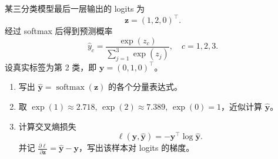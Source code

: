 某三分类模型最后一层输出的 logits 为
\[
\bm{z} = (1, 2, 0)^\top.
\]
经过 softmax 后得到预测概率
\[
\hat{y}_c = \frac{\exp(z_c)}{\sum_{j=1}^{3} \exp(z_j)},\quad c = 1, 2, 3.
\]
设真实标签为第 2 类，即 $\bm{y} = (0, 1, 0)^\top$。
\begin{enumerate}
    \item 写出 $\hat{\bm{y}} = \operatorname{softmax}(\bm{z})$ 的各个分量表达式。
    \item 取 $\exp(1) \approx 2.718$, $\exp(2) \approx 7.389$, $\exp(0) = 1$，近似计算 $\hat{\bm{y}}$。
    \item 计算交叉熵损失
    \[
    \ell(\bm{y}, \hat{\bm{y}}) = -\bm{y}^\top \log \hat{\bm{y}}.
    \]
    并记 $\frac{\partial \ell}{\partial \bm{z}} = \hat{\bm{y}} - \bm{y}$，写出该样本对 logits 的梯度。
\end{enumerate}
